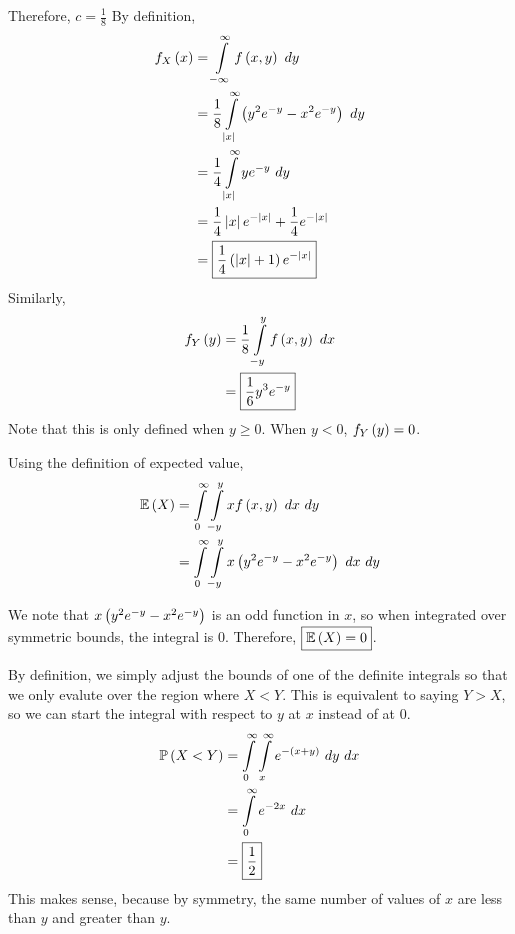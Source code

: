 \documentclass{article}
\begin{document}
Therefore, $\boxed{c = \frac{1}{8}}$
\subproblema{}
By definition,
\begin{align*}
  f_{X} \pars{x} &= \int \limits_{-\infty}^{\infty} f \pars{x, y}\ dy \\
                 &= \frac{1}{8} \int \limits_{\abs{x}}^{\infty} \pars{y^2 e^{-y} - x^2 e^{-y}}\ dy \\
                 &= \frac{1}{4} \int \limits_{\abs{x}}^{\infty} y e^{-y}\ dy \\
                 &= \frac{1}{4} \abs{x} e^{-\abs{x}} + \frac{1}{4} e^{-\abs{x}} \\
                 &= \boxed{\frac{1}{4} \pars{\abs{x} + 1} e^{-\abs{x}}}
\end{align*}
Similarly,
\begin{align*}
  f_{Y} \pars{y} &= \frac{1}{8} \int \limits_{-y}^{y} f \pars{x, y}\ dx \\
                 &= \boxed{\frac{1}{6} y^3 e^{-y}} \\
\end{align*}
Note that this is only defined when $y \geq 0$.
When $y < 0$, $f_{Y} \left (y \right) = 0$.

\subproblema{}
Using the definition of expected value,
\begin{align*}
  \mathbb{E} \left ( X \right) &= \int \limits_{0}^{\infty} \int \limits_{-y}^{y} x f \left (x, y \right)\ dx\ dy \\
         &= \int \limits_{0}^{\infty} \int \limits_{-y}^{y} x \left (y^2 e^{-y} - x^2 e^{-y} \right)\ dx\ dy \\
\end{align*}

We note that $x \left (y^2 e^{-y} - x^2 e^{-y} \right)$ is an odd function in $x$,
so when integrated over symmetric bounds, the integral is 0.
Therefore, $\boxed{\mathbb{E} \left ( X \right) = 0}$.

\setcounter{problem}{9}
\problem{}
\subproblema{}

By definition,
we simply adjust the bounds of one of the definite integrals so that we only evalute over the region where $X < Y$.
This is equivalent to saying $Y > X$,
so we can start the integral with respect to $y$ at $x$ instead of at $0$.
\begin{align*}
  \mathbb{P} \left ( X < Y \right) &= \int \limits_{0}^{\infty} \int \limits_{x}^{\infty} e^{- \left (x+y \right)}\ dy\ dx \\
             &= \int \limits_{0}^{\infty} e^{-2x}\ dx \\
             &= \boxed{\frac{1}{2}} \\
\end{align*}
This makes sense,
because by symmetry,
the same number of values of $x$ are less than $y$ and greater than $y$.
\end{document}
